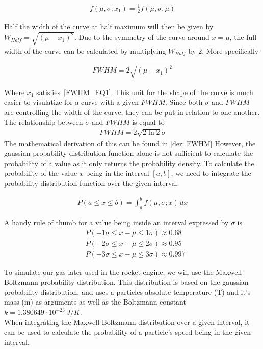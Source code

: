 \documentclass[reprint,english,notitlepage]{revtex4-2}
\begin{document}
\begin{align}
    f(\mu, \sigma; x_1) = \frac{1}{2} f(\mu, \sigma, \mu) \label{FWHM_EQ1}
\end{align}

Half the width of the curve at half maximum will then be given by $W_{Half} = \sqrt{(\mu - x_1)^2}$.
Due to the symmetry of the curve around $x =\mu$, the full width of the curve can be calculated by multiplying $W_{Half}$ by $2$.
More specifically

\begin{align*}
    FWHM = 2\sqrt{(\mu - x_1)^2}
\end{align*}

Where $x_1$ satisfies~\ref{FWHM_EQ1}. This unit for the shape of the curve is much easier to visulatize for a curve with a given $FWHM$.
Since both $\sigma$ and $FWHM$ are controlling the width of the curve, they can be put in relation to one another.
The relationship between $\sigma$ and $FWHM$ is equal to
\begin{align*}
    FWHM = 2\sqrt{2\ln2}\sigma
\end{align*}
The mathematical derivation of this can be found in
\ref{der: FWHM}
However, the gaussian probability distribution function alone is not sufficient to calculate the probability of a value as it only returns the probability density.
To calculate the probability of the value $x$ being in the interval $[a, b]$, we need to integrate the probability distribution function over the given interval.

\begin{align*}
    P(a ≤ x ≤ b) = \int_{a}^{b} f(\mu, \sigma; x) \, dx
\end{align*}

A handy rule of thumb for a value being inside an interval expressed by $\sigma$ is
\begin{align*}
    &P(-1\sigma ≤ x-\mu ≤ 1\sigma) ≈ 0.68\\
	&P(-2\sigma ≤ x-\mu ≤ 2\sigma) ≈ 0.95\\
	&P(-3\sigma ≤ x-\mu ≤ 3\sigma) ≈ 0.997
\end{align*}

To simulate our gas later used in the rocket engine, we will use the Maxwell-Boltzmann probability distribution.
This distribution is based on the gaussian probability distribution, and uses a particles absolute temperature (T) and it's mass (m) as arguments as well as the Boltzmann constant
$k = 1.380649 \cdot 10^{-23}\,J/K$.
\\When integrating the Maxwell-Boltzmann distribution over a given interval, it can be used to calculate the probability of a particle's speed being in the given interval.
\end{document}

